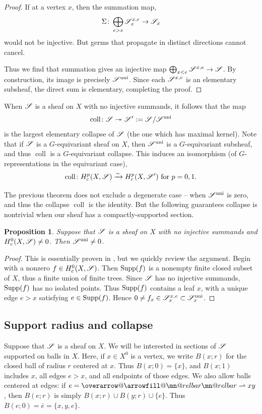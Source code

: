 \documentclass[letter]{amsart}
\makeatletter
\newtheorem{proposition}[thm]{Proposition}
\theoremstyle{definition}
\theoremstyle{remark}
\numberwithin{thm}{section}
\numberwithin{equation}{section}
\DeclareRobustCommand{\overrightharpoon}{\mathpalette{\overarrow@\rightharpoonfill@}}
\def\rightharpoonfill@{\arrowfill@\mn@relbar\mn@relbar\rightharpoonup}
\newcommand{\edge}[1]{\overrightharpoon{#1}}
\DeclareMathOperator{\uni}{uni}
\DeclareMathOperator{\coll}{coll}
\makeatother
\begin{document}
\begin{proof}
If at a vertex $x$, then the summation map,
$$\Sigma \colon \bigoplus_{e > x} {\mathscr{S}}_x^{x,e} \rightarrow {\mathscr{S}}_x$$
would not be injective.  But germs that propagate in distinct directions cannot cancel.  

Thus we find that summation gives an injective map $\bigoplus_{x < e} {\mathscr{S}}^{x,e} \rightarrow {\mathscr{S}}$.  By construction, its image is precisely $\sheaf{S}^{\uni}$.  Since each ${\mathscr{S}}^{x,e}$ is an elementary subsheaf, the direct sum is elementary, completing the proof.
\end{proof}

When ${\mathscr{S}}$ is a sheaf on $X$ with no injective summands, it follows that the map
$$\coll \From \sheaf{S} \Onto \sheaf{S}' := \sheaf{S} / \sheaf{S}^{\uni}$$
is the largest elementary collapse of ${\mathscr{S}}$ (the one which has maximal kernel).  Note that if ${\mathscr{S}}$ is a $G$-equivariant sheaf on $X$, then $\sheaf{S}^{\uni}$ is  a $G$-equivariant subsheaf, and thus $\coll$ is a $G$-equivariant collapse.  This induces an isomorphism (of $G$-representations in the equivariant case),
$$\coll \From H_c^p(X, \sheaf{S}) \xrightarrow{\sim} H_c^p(X, \sheaf{S}') \text{ for } p = 0, 1.$$

The previous theorem does not exclude a degenerate case -- when $\sheaf{S}^{\uni}$ is zero, and thus the collapse $\coll$ is the identity.  But the following guarantees collapse is nontrivial when our sheaf has a compactly-supported section.
\begin{proposition}
\label{Suni-nonzero}
Suppose that ${\mathscr{S}}$ is a sheaf on $X$ with no injective summands and $H_c^0(X, {\mathscr{S}}) \neq 0$.  Then $\sheaf{S}^{\uni} \neq 0$.
\end{proposition}
\begin{proof}
This is essentially proven in \cite{MWInd}, but we quickly review the argument.  Begin with a nonzero $f \in H_c^0(X, {\mathscr{S}})$.  Then $\operatorname{Supp}(f)$ is a nonempty finite closed subset of $X$, thus a finite union of finite trees.  Since ${\mathscr{S}}$ has no injective summands, $\operatorname{Supp}(f)$ has no isolated points.  Thus $\operatorname{Supp}(f)$ contains a leaf $x$, with a unique edge $e > x$ satisfying $e \in \operatorname{Supp}(f)$.  Hence $0 \neq f_x \in \sheaf{S}_x^{x,e} \subset \sheaf{S}_x^{\uni}$.  
\end{proof}

\subsection{Support radius and collapse}
Suppose that ${\mathscr{S}}$ is a sheaf on $X$.  We will be interested in sections of ${\mathscr{S}}$ supported on balls in $X$.  Here, if $x \in X^0$ is a vertex, we write $B(x; r)$ for the closed ball of radius $r$ centered at $x$.  Thus $B(x; 0) = \{ x \}$, and $B(x; 1)$ includes $x$, all edges $e > x$, and all endpoints of those edges.  We also allow balls centered at edges:  if $e = \edge{xy}$, then $B(e; r)$ is simply $B(x;r) \cup B(y;r) \cup \{ e \}$.  Thus $B(e;0) = \bar e = \{ x,y,e \}$.   
\end{document}

